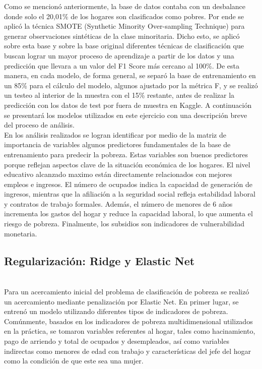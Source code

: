 \documentclass[a4paper]{article}
\theoremstyle{remark}
\theoremstyle{definition}
\begin{document}
Como se mencionó anteriormente, la base de datos contaba con un desbalance donde solo el 20,01\% de los hogares son clasificados como pobres. Por ende se aplicó la técnica SMOTE (Synthetic Minority Over-sampling Technique) para generar observaciones sintéticas de la clase minoritaria. Dicho esto, se aplicó sobre esta base y sobre la base original diferentes técnicas de clasificación que buscan lograr un mayor proceso de aprendizaje a partir de los datos y una predicción que llevara a un valor del F1 Score más cercano al 100\%. De esta manera, en cada modelo, de forma general, se separó la base de entrenamiento en un 85\% para el cálculo del modelo, algunos ajustado por la métrica F, y se realizó un testeo al interior de la muestra con el 15\% restante, antes de realizar la predicción con los datos de test por fuera de muestra en Kaggle.  A continuación se presentará los modelos utilizados en este ejercicio con una descripción breve del proceso de análisis. \\

En los análisis realizados se logran identificar por medio de la matriz de importancia de variables algunos predictores fundamentales de la base de entrenamiento para predecir la pobreza. Estas variables son buenos predictores porque reflejan aspectos clave de la situación económica de los hogares. El nivel educativo alcanzado maximo están directamente relacionados con mejores empleos e ingresos. El número de ocupados indica la capacidad de generación de ingresos, mientras que la afiliación a la seguridad social refleja estabilidad laboral y contratos de trabajo formales. Además, el número de menores de 6 años incrementa los gastos del hogar y reduce la capacidad laboral, lo que aumenta el riesgo de pobreza. Finalmente, los subsidios son indicadores de vulnerabilidad monetaria. 

\subsection{Regularización: Ridge y Elastic Net} \\

Para un acercamiento inicial del problema de clasificación de pobreza se realizó un acercamiento mediante penalización por Elastic Net. En primer lugar, se entrenó un modelo utilizando diferentes tipos de indicadores de pobreza. Comúnmente, basados en los indicadores de pobreza multidimensional utilizados en la práctica, se tomaron variables referentes al hogar, tales como hacinamiento, pago de arriendo y total de ocupados y desempleados, así como variables indirectas como menores de edad con trabajo y características del jefe del hogar como la condición de que este sea una mujer.\\
\end{document}

